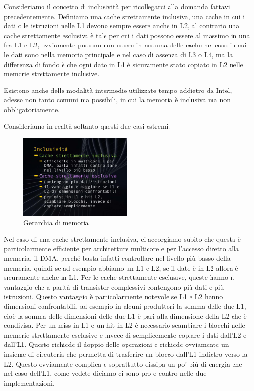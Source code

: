 Consideriamo il concetto di inclusività per ricollegarci alla domanda fattavi precedentemente.
Definiamo una cache strettamente inclusiva, una cache in cui i dati o le istruzioni nelle L1 devono sempre essere anche in L2, al contrario una cache strettamente esclusiva è tale per cui i dati possono essere al massimo in una fra L1 e L2, ovviamente possono non essere in nessuna delle cache nel caso in cui le dati sono nella memoria principale e nel caso di assenza di L3 o L4, ma la differenza di fondo è che ogni dato in L1 è sicuramente stato copiato in L2 nelle memorie strettamente inclusive.

Esistono anche delle modalità intermedie utilizzate tempo addietro da Intel, adesso non tanto comuni ma possibili, in cui la memoria è inclusiva ma non obbligatoriamente.

Consideriamo in realtà soltanto questi due casi estremi.

\FloatBarrier
\begin{figure}[H]
  \centering
  \includegraphics[width=0.50\textwidth,
                    trim=20 20 10 20, %
                    clip]
                    {images/Lez06_p05_fig_02}
  \caption{Gerarchia di memoria}
  \label{fig:Lez06_p05_fig_02}
\end{figure}
\FloatBarrier
\noindent

Nel caso di una cache strettamente inclusiva, ci accorgiamo subito che questa è particolarmente efficiente per architetture multicore e per l'accesso diretto alla memoria, il DMA, perché basta infatti controllare nel livello più basso della memoria, quindi se ad esempio abbiamo un L1 e L2, se il dato è in L2 allora è sicuramente anche in L1.
Per le cache strettamente esclusive, queste hanno il vantaggio che a parità di transistor complessivi contengono più dati e più istruzioni.
Questo vantaggio è particolarmente notevole se L1 e L2 hanno dimensioni confrontabili, ad esempio in alcuni produttori la somma delle due L1, cioè la somma delle dimensioni delle due L1 è pari alla dimensione della L2 che è condivisa.
Per un miss in L1 e un hit in L2 è necessario scambiare i blocchi nelle memorie strettamente esclusive e invece di semplicemente copiare i dati dall'L2 e dall'L1.
Questo richiede il doppio delle operazioni e richiede ovviamente un insieme di circuteria che permetta di trasferire un blocco dall'L1 indietro verso la L2.
Questo ovviamente complica e soprattutto dissipa un po' più di energia che nel caso dell'L1, come vedete diciamo ci sono pro e contro nelle due implementazioni.

